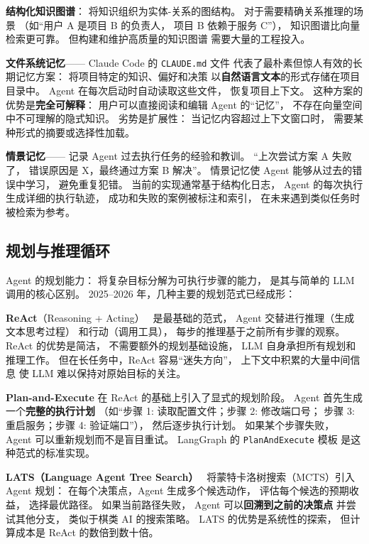\textbf{结构化知识图谱}：
将知识组织为实体-关系的图结构。
对于需要精确关系推理的场景
（如“用户 A 是项目 B 的负责人，
项目 B 依赖于服务 C”），
知识图谱比向量检索更可靠。
但构建和维护高质量的知识图谱
需要大量的工程投入。

\textbf{文件系统记忆}——
Claude Code 的 \texttt{CLAUDE.md} 文件
代表了最朴素但惊人有效的长期记忆方案：
将项目特定的知识、偏好和决策
以\textbf{自然语言文本}的形式存储在项目目录中。
Agent 在每次启动时自动读取这些文件，
恢复项目上下文。
这种方案的优势是\textbf{完全可解释}：
用户可以直接阅读和编辑 Agent 的“记忆”，
不存在向量空间中不可理解的隐式知识。
劣势是扩展性：
当记忆内容超过上下文窗口时，
需要某种形式的摘要或选择性加载。

\textbf{情景记忆}——
记录 Agent 过去执行任务的经验和教训。
“上次尝试方案 A 失败了，
错误原因是 X，最终通过方案 B 解决”。
情景记忆使 Agent 能够从过去的错误中学习，
避免重复犯错。
当前的实现通常基于结构化日志，
Agent 的每次执行生成详细的执行轨迹，
成功和失败的案例被标注和索引，
在未来遇到类似任务时被检索为参考。

\subsection{规划与推理循环}

Agent 的规划能力：
将复杂目标分解为可执行步骤的能力，
是其与简单的 LLM 调用的核心区别。
2025--2026 年，几种主要的规划范式已经成形：

\textbf{ReAct}（Reasoning + Acting）~\cite{yao2023react}
是最基础的范式，
Agent 交替进行推理（生成文本思考过程）
和行动（调用工具），
每步的推理基于之前所有步骤的观察。
ReAct 的优势是简洁，
不需要额外的规划基础设施，
LLM 自身承担所有规划和推理工作。
但在长任务中，ReAct 容易“迷失方向”，
上下文中积累的大量中间信息
使 LLM 难以保持对原始目标的关注。

\textbf{Plan-and-Execute}
在 ReAct 的基础上引入了显式的规划阶段。
Agent 首先生成一个\textbf{完整的执行计划}
（如“步骤 1: 读取配置文件；步骤 2: 修改端口号；
步骤 3: 重启服务；步骤 4: 验证端口”），
然后逐步执行计划。
如果某个步骤失败，
Agent 可以重新规划而不是盲目重试。
LangGraph 的 \texttt{PlanAndExecute} 模板
是这种范式的标准实现。

\textbf{LATS（Language Agent Tree Search）}~\cite{zhou2024lats}
将蒙特卡洛树搜索（MCTS）引入 Agent 规划：
在每个决策点，Agent 生成多个候选动作，
评估每个候选的预期收益，
选择最优路径。
如果当前路径失败，
Agent 可以\textbf{回溯到之前的决策点}
并尝试其他分支，
类似于棋类 AI 的搜索策略。
LATS 的优势是系统性的探索，
但计算成本是 ReAct 的数倍到数十倍。

